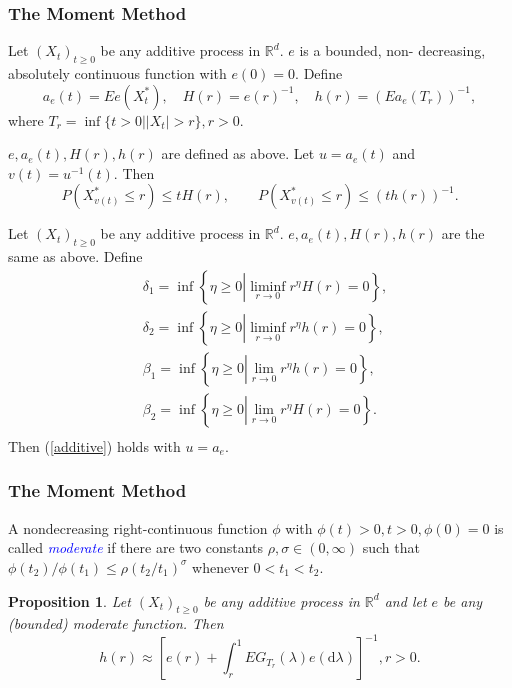 \documentclass[12pt]{beamer}
\def\RR{\mathbb{R}}
\def\d{\mathrm{d}}
\newtheorem{proposition}{Proposition}
\begin{document}
\begin{frame}
	\frametitle{The Moment Method}
	\begin{definition}
		Let $(X_t)_{t\ge0}$ be any additive process in $\RR^d$. $e$ is a bounded, non- decreasing, absolutely continuous function with $e(0)=0$. Define
		$$
		a_e(t)=Ee(X_t^*),\quad H(r)=e(r)^{-1},\quad h(r)=(Ea_e(T_r))^{-1},
		$$
		where $T_r=\inf\{t>0| |X_t|>r\},r>0$.
	\end{definition}
	\pause
	\begin{lemma}
		$e,a_e(t),H(r),h(r)$ are defined as above. Let $u=a_e(t)$ and $v(t)=u^{-1}(t)$. Then
		$$
		P(X_{v(t)}^*\le r) \le t H(r), \qquad P(X_{v(t)}^*\le r) \le (th(r))^{-1}.
		$$
	\end{lemma}
\end{frame}
\begin{frame}
	\begin{theorem}
		Let $(X_t)_{t\ge 0}$ be any additive process in $\RR^d$. $e,a_e(t),H(r),h(r)$ are the same as above. Define
		\vspace{-1ex}
		\begin{equation*}
			\begin{split}
				& \delta_1=\inf\left\{ \eta\ge0\left|\liminf_{r\to0}r^\eta H(r)=0\right. \right\},\\
				& \delta_2=\inf\left\{ \eta\ge0\left|\liminf_{r\to0}r^\eta h(r)=0\right. \right\},\\
				& \beta_1=\inf\left\{ \eta\ge0\left|\lim_{r\to0}r^\eta h(r)=0\right. \right\},\\
				& \beta_2=\inf\left\{ \eta\ge0\left|\lim_{r\to0}r^\eta H(r)=0\right. \right\}.\\
			\end{split}
		\end{equation*}
		Then (\ref{additive}) holds with $u=a_e$. 
	\end{theorem}
\end{frame}
\begin{frame}
	\frametitle{The Moment Method}
	\begin{definition}
		A nondecreasing right-continuous function $\phi$ with $\phi(t)>0,t>0,\phi(0)=0$ is called \emph{\textcolor{blue}{moderate}} if there are two constants $\rho,\sigma\in (0,\infty)$ such that $\phi(t_2)/\phi(t_1)\le\rho(t_2/t_1)^\sigma$ whenever $0<t_1<t_2$.
	\end{definition}
	\pause
	\begin{proposition}
		Let $(X_t)_{t\ge0}$ be any additive process in $\RR^d$ and let $e$ be any (bounded) moderate function. Then
		$$
		h(r) \approx \left[e(r) + \int_r^1 EG_{T_r}(\lambda)e(\d \lambda)\right]^{-1}, r>0.
		$$
	\end{proposition}
\end{frame}
\end{document}
